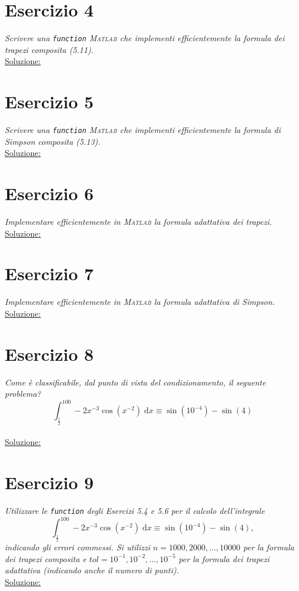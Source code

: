 \section{Esercizio 4}
\label{sub:es4}
\emph{Scrivere una \lstinline{function} \textsc{Matlab} che implementi efficientemente la formula dei trapezi composita (5.11).}\\
\underline{Soluzione:}\\

\section{Esercizio 5}
\label{sub:es5}
\emph{Scrivere una \lstinline{function} \textsc{Matlab} che implementi efficientemente la formula di Simpson composita (5.13).}\\
\underline{Soluzione:}\\

\section{Esercizio 6}
\label{sub:es6}
\emph{Implementare efficientemente in \textsc{Matlab} la formula adattativa dei trapezi.}\\
\underline{Soluzione:}\\


\section{Esercizio 7}
\label{sub:es7}
\emph{Implementare efficientemente in \textsc{Matlab} la formula adattativa di Simpson.}\\
\underline{Soluzione:}\\

\section{Esercizio 8}
\label{sub:es8}
\emph{Come è classificabile, dal punto di vista del condizionamento, il seguente problema?
			$$\int_{\frac{1}{2}}^{100}-2x^{-3}\cos\left(x^{-2}\right)\;\mathrm{d}x\equiv\sin\left(10^{-4}\right)-\sin(4)$$}\\
\underline{Soluzione:}\\

\section{Esercizio 9}
\label{sub:es9}
\emph{Utilizzare le \lstinline{function} degli Esercizi 5.4 e 5.6 per il calcolo dell'integrale
      $$\int_{\frac{1}{2}}^{100}-2x^{-3}\cos\left(x^{-2}\right)\;\mathrm{d}x\equiv\sin\left(10^{-4}\right)-\sin(4),$$
			indicando gli errori commessi.
      Si utilizzi $n=1000,2000,\dots,10000$ per la formula dei trapezi composita e
      $tol=10^{-1},10^{-2},\dots,10^{-5}$ per la formula dei trapezi adattativa (indicando anche il numero di punti).}\\
			\underline{Soluzione:}\\

